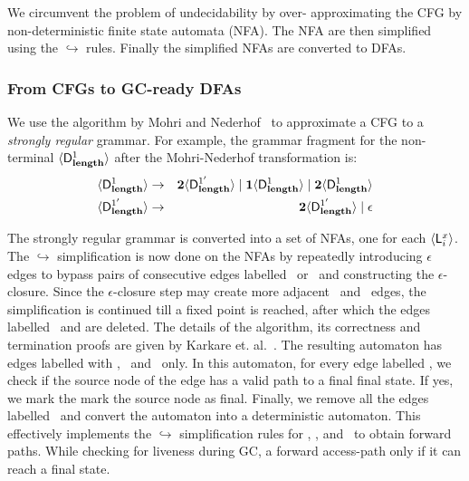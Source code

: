 \documentclass[9pt]{sigplanconf}
\begin{document}
We circumvent the problem  of undecidability by over- approximating the
CFG by non-deterministic finite state automata (NFA). The NFA are then
simplified using  the $\hookrightarrow$ rules.  Finally the simplified
NFAs are converted to DFAs.

\subsubsection{From CFGs to GC-ready DFAs}
\label{sec:NFA-approx}
 We use  the algorithm by Mohri  and Nederhof~\cite{mohri00regular} to
 approximate a CFG to a {\em strongly regular\/} grammar.  For
 example, the grammar
 fragment  for  the  non-terminal  $\langle \mathsf{D}_{\mathit {\mathbf{length}}}^{1}\rangle$  after  the
 Mohri-Nederhof transformation is:
 \begin{eqnarray*}
   \langle \mathsf{D}_{\mathit {\mathbf{length}}}^{1}\rangle &\rightarrow& {\mathbf{2}}\langle \mathsf{D}_{\mathit {\mathbf{length}}}^{1'}\rangle \mid
   \mathbf{1}\langle \mathsf{D}_{\mathit {\mathbf{length}}}^{1}\rangle
   \mid {\mathbf{2}}\langle \mathsf{D}_{\mathit {\mathbf{length}}}^{1}\rangle\\
   \langle \mathsf{D}_{\mathit {\mathbf{length}}}^{1'}\rangle &\rightarrow& {\mathbf{2}}\langle \mathsf{D}_{\mathit {\mathbf{length}}}^{1'}\rangle
   \mid \epsilon
 \end{eqnarray*}

The strongly regular grammar is converted  into a set of NFAs, one for
each $\langle \mathsf{L}_{{i}}^{x}\rangle$.  The $\hookrightarrow$ simplification is now
done on the NFAs by  repeatedly introducing $\epsilon$ edges to bypass
pairs  of consecutive  edges labelled  \bcar\acar\ or  \bcdr\acdr\ and
constructing the $\epsilon$-closure. Since the $\epsilon$-closure step
may  create  more  adjacent  \bcar\acar\ and  \bcdr\acdr\  edges,  the
simplification is continued till a fixed point is reached, after which
the edges labelled \bcar \ and  \bcdr are deleted.  The details of the
algorithm, its correctness and termination proofs are given by Karkare
et.  al.~\cite{karkare07liveness,asati14lgc}.  The resulting automaton
has  edges labelled  with  \acar,  \acdr\ and  \clazy\  only. In  this
automaton, for every edge labelled \clazy, we check if the source node
of the edge has a valid path to  a final final state.  If yes, we mark
the mark  the source node as  final. Finally, we remove  all the edges
labelled  \clazy\  and  convert  the automaton  into  a  deterministic
automaton.    This   effectively  implements   the   $\hookrightarrow$
simplification rules for  \bcar, \bcdr, and \clazy\  to obtain forward
paths. While  checking for liveness  during GC, a  forward access-path
only if it can reach a final state.
\end{document}

